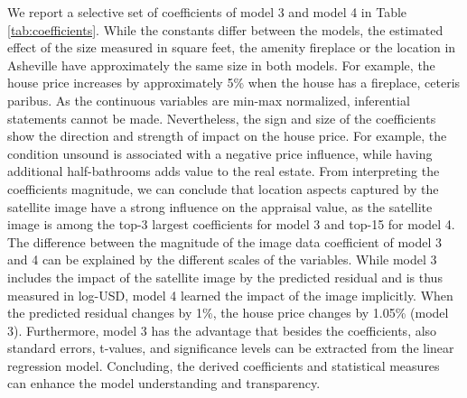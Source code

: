 \documentclass[letterpaper]{article} %
\begin{document}
We report a selective set of coefficients of model 3 and model 4 in Table \ref{tab:coefficients}. While the constants differ between the models, the estimated effect of the size measured in square feet, the amenity fireplace or the location in Asheville have approximately the same size in both models. For example, the house price increases by approximately 5\% when the house has a fireplace, ceteris paribus. As the continuous variables are min-max normalized, inferential statements cannot be made. Nevertheless, the sign and size of the coefficients show the direction and strength of impact on the house price. For example, the condition unsound is associated with a negative price influence, while having additional half-bathrooms adds value to the real estate. From interpreting the coefficients magnitude, we can conclude that location aspects captured by the satellite image have a strong influence on the appraisal value, as the satellite image is among the top-3 largest coefficients for model 3 and top-15 for model 4. The difference between the magnitude of the image data coefficient of model 3 and 4 can be explained by the different scales of the variables. While model 3 includes the impact of the satellite image by the predicted residual and is thus measured in log-USD, model 4 learned the impact of the image implicitly. When the predicted residual changes by 1\%, the house price changes by 1.05\% (model 3). Furthermore, model 3 has the advantage that besides the coefficients, also standard errors, t-values, and significance levels can be extracted from the linear regression model. Concluding, the derived coefficients and statistical measures can enhance the model understanding and transparency.
\end{document}
